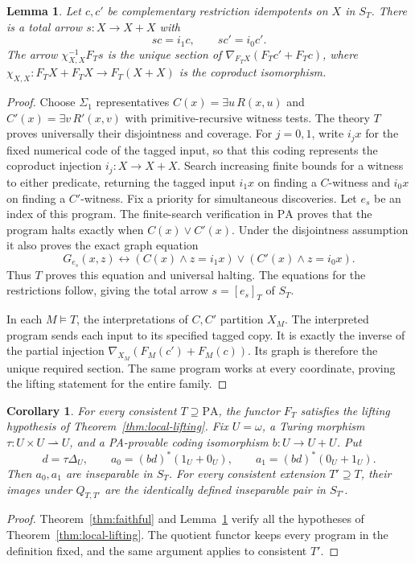 \documentclass[11pt]{article}
\newtheorem{lemma}[theorem]{Lemma}
\newtheorem{corollary}[theorem]{Corollary}
\newcommand{\PA}{\mathrm{PA}}
\begin{document}
\begin{lemma}\label{lem:switch}
Let $c,c'$ be complementary restriction idempotents on $X$ in $S_T$.
There is a total arrow $s:X\to X+X$ with
\[
 sc=i_1c,\qquad sc'=i_0c'.
\]
The arrow $\chi_{X,X}^{-1}F_Ts$ is the unique section of
$\nabla_{F_TX}(F_Tc'+F_Tc)$, where
$\chi_{X,X}:F_TX+F_TX\to F_T(X+X)$ is the coproduct isomorphism.
\end{lemma}
\begin{proof}
Choose $\Sigma_1$ representatives $C(x)=\exists u\,R(x,u)$ and
$C'(x)=\exists v\,R'(x,v)$ with primitive-recursive witness tests.
The theory $T$ proves universally their disjointness and coverage.
For $j=0,1$, write $i_jx$ for the fixed numerical code of the
tagged input, so that this coding represents the coproduct injection
$i_j:X\to X+X$.
Search increasing finite bounds for a witness to either predicate,
returning the tagged input $i_1x$ on finding a $C$-witness and $i_0x$
on finding a $C'$-witness. Fix a priority for simultaneous discoveries.
Let $e_s$ be an index of this program. The finite-search verification
in $\PA$ proves that the program halts
exactly when $C(x)\lor C'(x)$. Under the disjointness assumption it also
proves the exact graph equation
\[
 G_{e_s}(x,z)\leftrightarrow
 (C(x)\land z=i_1x)\lor(C'(x)\land z=i_0x).
\]
Thus $T$ proves this equation and universal halting. The equations for
the restrictions follow, giving the total arrow $s=[e_s]_T$ of $S_T$.

In each $M\models T$, the interpretations of $C,C'$ partition $X_M$.
The interpreted program sends each input to its specified tagged copy.
It is exactly the inverse of the partial injection
$\nabla_{X_M}(F_M(c')+F_M(c))$. Its graph is therefore the unique required
section. The same program works at every coordinate, proving the lifting
statement for the entire family.
\end{proof}

\begin{corollary}\label{cor:pair}
For every consistent $T\supseteq\PA$, the functor $F_T$ satisfies the
lifting hypothesis of Theorem~\ref{thm:local-lifting}.
Fix $U=\omega$, a Turing morphism $\tau:U\times U\rightharpoonup U$,
and a PA-provable coding isomorphism $b:U\to U+U$. Put
\[
 d=\tau\Delta_U,\qquad
 a_0=(bd)^*(1_U+0_U),\qquad a_1=(bd)^*(0_U+1_U).
\]
Then $a_0,a_1$ are inseparable in $S_T$. For every consistent
extension $T'\supseteq T$, their images under $Q_{T,T'}$ are the
identically defined inseparable pair in $S_{T'}$.
\end{corollary}
\begin{proof}
Theorem~\ref{thm:faithful} and Lemma~\ref{lem:switch} verify all the
hypotheses of Theorem~\ref{thm:local-lifting}. The quotient functor keeps
every program in the definition fixed, and the same argument applies
to consistent $T'$.
\end{proof}
\end{document}
